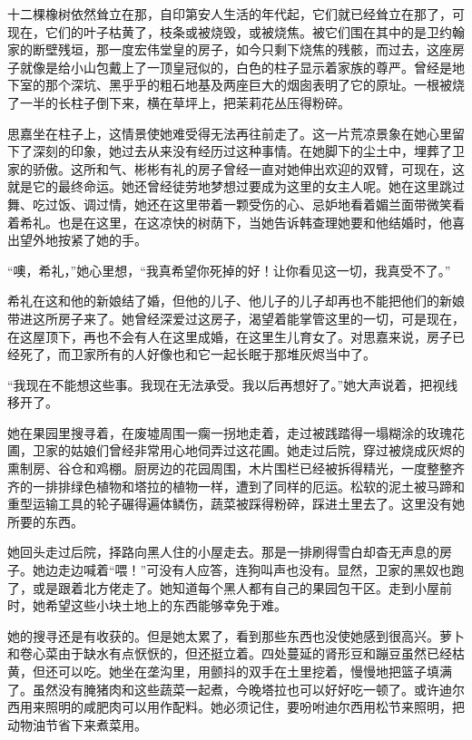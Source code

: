 \par 十二棵橡树依然耸立在那，自印第安人生活的年代起，它们就已经耸立在那了，可现在，它们的叶子枯黄了，枝条或被烧毁，或被烧焦。被它们围在其中的是卫约翰家的断壁残垣，那一度宏伟堂皇的房子，如今只剩下烧焦的残骸，而过去，这座房子就像是给小山包戴上了一顶皇冠似的，白色的柱子显示着家族的尊严。曾经是地下室的那个深坑、黑乎乎的粗石地基及两座巨大的烟囱表明了它的原址。一根被烧了一半的长柱子倒下来，横在草坪上，把茉莉花丛压得粉碎。
\par 思嘉坐在柱子上，这情景使她难受得无法再往前走了。这一片荒凉景象在她心里留下了深刻的印象，她过去从来没有经历过这种事情。在她脚下的尘土中，埋葬了卫家的骄傲。这所和气、彬彬有礼的房子曾经一直对她伸出欢迎的双臂，可现在，这就是它的最终命运。她还曾经徒劳地梦想过要成为这里的女主人呢。她在这里跳过舞、吃过饭、调过情，她还在这里带着一颗受伤的心、忌妒地看着媚兰面带微笑看着希礼。也是在这里，在这凉快的树荫下，当她告诉韩查理她要和他结婚时，他喜出望外地按紧了她的手。
\par “噢，希礼，”她心里想，“我真希望你死掉的好！让你看见这一切，我真受不了。”
\par 希礼在这和他的新娘结了婚，但他的儿子、他儿子的儿子却再也不能把他们的新娘带进这所房子来了。她曾经深爱过这房子，渴望着能掌管这里的一切，可是现在，在这屋顶下，再也不会有人在这里成婚，在这里生儿育女了。对思嘉来说，房子已经死了，而卫家所有的人好像也和它一起长眠于那堆灰烬当中了。
\par “我现在不能想这些事。我现在无法承受。我以后再想好了。”她大声说着，把视线移开了。
\par 她在果园里搜寻着，在废墟周围一瘸一拐地走着，走过被践踏得一塌糊涂的玫瑰花圃，卫家的姑娘们曾经非常用心地伺弄过这花圃。她走过后院，穿过被烧成灰烬的熏制房、谷仓和鸡棚。厨房边的花园周围，木片围栏已经被拆得精光，一度整整齐齐的一排排绿色植物和塔拉的植物一样，遭到了同样的厄运。松软的泥土被马蹄和重型运输工具的轮子碾得遍体鳞伤，蔬菜被踩得粉碎，踩进土里去了。这里没有她所要的东西。
\par 她回头走过后院，择路向黑人住的小屋走去。那是一排刷得雪白却杳无声息的房子。她边走边喊着“喂！”可没有人应答，连狗叫声也没有。显然，卫家的黑奴也跑了，或是跟着北方佬走了。她知道每个黑人都有自己的果园包干区。走到小屋前时，她希望这些小块土地上的东西能够幸免于难。
\par 她的搜寻还是有收获的。但是她太累了，看到那些东西也没使她感到很高兴。萝卜和卷心菜由于缺水有点恹恹的，但还挺立着。四处蔓延的肾形豆和蹦豆虽然已经枯黄，但还可以吃。她坐在垄沟里，用颤抖的双手在土里挖着，慢慢地把篮子填满了。虽然没有腌猪肉和这些蔬菜一起煮，今晚塔拉也可以好好吃一顿了。或许迪尔西用来照明的咸肥肉可以用作配料。她必须记住，要吩咐迪尔西用松节来照明，把动物油节省下来煮菜用。
